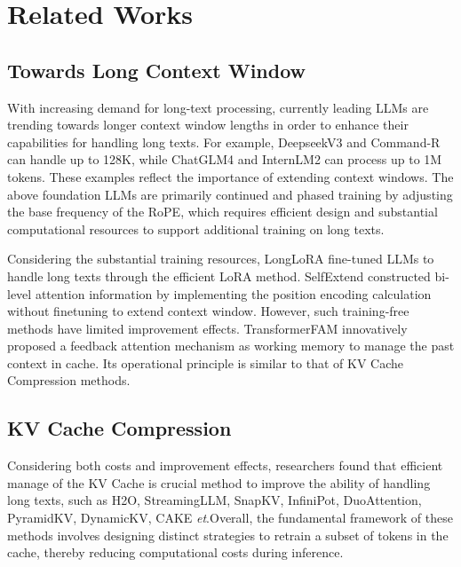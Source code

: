 \section{Related Works}
\subsection{Towards Long Context Window}
With increasing demand for long-text processing, currently leading LLMs are trending towards longer context window lengths in order to enhance their capabilities for handling long texts. For example, DeepseekV3 and Command-R\citep{command} can handle up to 128K, while ChatGLM4 and InternLM2\citep{cai2024internlm2} can process up to 1M tokens. These examples reflect the importance of extending context windows. The above foundation LLMs are primarily continued and phased training by adjusting the base frequency of the RoPE\citep{su2024roformer}, which requires efficient design and substantial computational resources to support additional training on long texts\citep{xiong2023effective}.

Considering the substantial training resources, LongLoRA\citep{chen2023longlora} fine-tuned LLMs to handle long texts through the efficient LoRA\cite{hu2021lora} method. SelfExtend\citep{jin2024llm} constructed bi-level attention information by implementing the position encoding calculation without finetuning to extend context window. However, such training-free methods have limited improvement effects. TransformerFAM\citep{hwang2024transformerfam} innovatively proposed a feedback attention mechanism as working memory to manage the past context in cache. Its operational principle is similar to that of KV Cache Compression methods.

\subsection{KV Cache Compression}
Considering both costs and improvement effects, researchers found that efficient manage of the KV Cache is crucial method to improve the ability of handling long texts, such as H2O\citep{zhang2023h2o}, StreamingLLM\citep{xiao2023efficient}, SnapKV\citep{li2024snapkv}, InfiniPot\citep{kim2024infinipot}, DuoAttention\citep{xiao2024duoattention}, PyramidKV\citep{cai2024pyramidkv}, DynamicKV\citep{zhou2024dynamickv}, CAKE\citep{qin2025cake} \textit{et}.Overall, the fundamental framework of these methods involves designing distinct strategies to retrain a subset of tokens in the cache, thereby reducing computational costs during inference.

